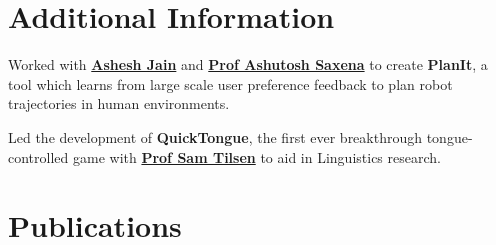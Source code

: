 \documentclass[]{deedy-resume-openfont}
\begin{document}
\begin{minipage}[t]{0.50\textwidth}

\section{Additional Information}
Worked with \textbf{\href{http://www.cs.cornell.edu/~ashesh/}{Ashesh Jain}} and \textbf{\href{http://www.cs.cornell.edu/~asaxena/}{Prof Ashutosh Saxena}} to create \textbf{PlanIt}, a tool which  learns from large scale user preference feedback to plan robot trajectories in human environments.  
\sectionsep

Led the development of \textbf{QuickTongue}, the first ever breakthrough tongue-controlled game with \textbf{\href{http://conf.ling.cornell.edu/~tilsen/}{Prof Sam Tilsen}} to aid in Linguistics research. 
\sectionsep


\section{Publications} 
\renewcommand\refname{\vskip -1.5em} %


\nocite{*}

\end{minipage} 
\end{document}
